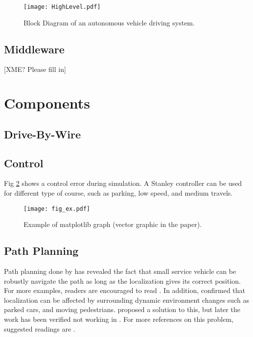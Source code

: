 \documentclass[conference]{IEEEtran}
\begin{document}
\begin{figure}[!t]
\centering
\texttt{[image: HighLevel.pdf]}
\caption{Block Diagram of an autonomous vehicle driving system.}
\label{fig_1}
\end{figure}

\subsection{Middleware}\label{middleware}

{[}XME? Please fill in{]}

\section{Components}\label{components}

\subsection{Drive-By-Wire}\label{drive-by-wire}

\subsection{Control}\label{control}

Fig \ref{fig_2} shows a control error during simulation. A Stanley
controller can be used for different type of course, such as parking,
low speed, and medium travels.

\begin{figure}[!t]
\centering
\texttt{[image: fig\_ex.pdf]}
\caption{Example of matplotlib graph (vector graphic in the paper).}
\label{fig_2}
\end{figure}

\subsection{Path Planning}\label{path-planning}

Path planning done by \citeauthor{SongZW_IV_2015} has revealed the fact
that small service vehicle can be robustly navigate the path as long as
the localization gives its correct position. For more examples, readers
are encouraged to read \citep{Corley-etal_2011}. In addition,
\citet{Corley-etal_2012} confirmed that localization can be affected by
surrounding dynamic environment changes such as parked cars, and moving
pedestrians. \citet{Aalst-etal_2004} proposed a solution to this, but
later the work has been verified not working in
\citep{Abadi-etal_2008, Abebe-etal_2009}. For more references on this
problem, suggested readings are
\citep{Ackerman-Halverson_1998, Agrawal-etal_1998, Ali-etal_2012, Alipour-etal_2013}.
\end{document}
